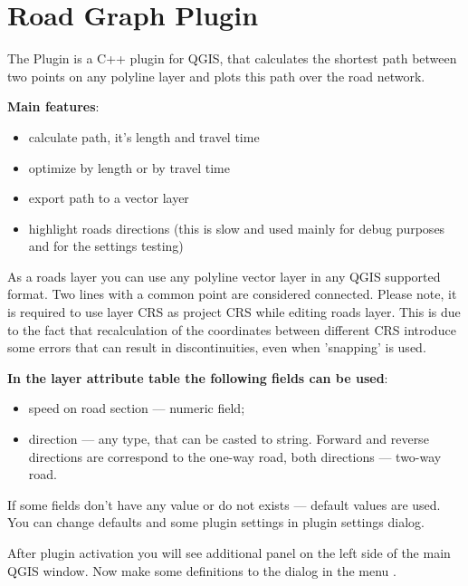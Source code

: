 
\section{Road Graph Plugin}\label{sec:roadgraph}



The  Plugin is a C++ plugin for QGIS, that calculates the shortest path 
between two points on any polyline layer and plots this path over the road network. 

\textbf{Main features}:

\begin{itemize}
\item calculate path, it's length and travel time
\item optimize by length or by travel time
\item export path to a vector layer
\item highlight roads directions (this is slow and used mainly for debug purposes and for the settings 
testing)
\end{itemize}

As a roads layer you can use any polyline vector layer in any QGIS supported format. Two lines with 
a common point are considered connected. Please note, it is required to use layer CRS as project CRS 
while editing roads layer. This is due to the fact that recalculation of the coordinates between 
different CRS introduce some errors that can result in discontinuities, even when 'snapping' is used.

\textbf{In the layer attribute table the following fields can be used}:

\begin{itemize}
\item speed on road section — numeric field;
\item direction — any type, that can be casted to string. Forward and reverse directions are correspond 
to the one-way road, both directions — two-way road.
\end{itemize}

If some fields don't have any value or do not exists — default values are used. You can change defaults 
and some plugin settings in plugin settings dialog.


After plugin activation you will see additional panel on the left side of the main QGIS window. Now 
make some definitions to the  dialog in the menu 
 \arrow {}. 


